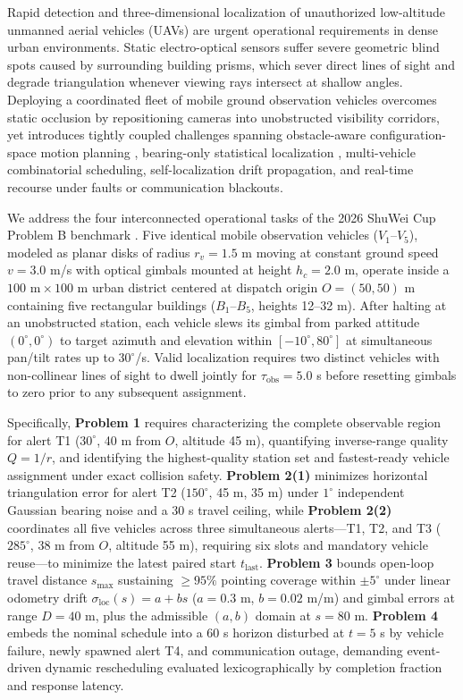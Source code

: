 Rapid detection and three-dimensional localization of unauthorized low-altitude unmanned aerial vehicles (UAVs) are urgent operational requirements in dense urban environments. Static electro-optical sensors suffer severe geometric blind spots caused by surrounding building prisms, which sever direct lines of sight and degrade triangulation whenever viewing rays intersect at shallow angles. Deploying a coordinated fleet of mobile ground observation vehicles overcomes static occlusion by repositioning cameras into unobstructed visibility corridors, yet introduces tightly coupled challenges spanning obstacle-aware configuration-space motion planning \cite{lozano1983}, bearing-only statistical localization \cite{bishop2010}, multi-vehicle combinatorial scheduling, self-localization drift propagation, and real-time recourse under faults or communication blackouts.

We address the four interconnected operational tasks of the 2026 ShuWei Cup Problem B benchmark \cite{problem}. Five identical mobile observation vehicles ($V_1$--$V_5$), modeled as planar disks of radius $r_v=1.5$ m moving at constant ground speed $v=3.0$ m/s with optical gimbals mounted at height $h_c=2.0$ m, operate inside a $100\text{ m}\times 100\text{ m}$ urban district centered at dispatch origin $O=(50,50)$ m containing five rectangular buildings ($B_1$--$B_5$, heights 12--32 m). After halting at an unobstructed station, each vehicle slews its gimbal from parked attitude $(0^\circ,0^\circ)$ to target azimuth and elevation within $[-10^\circ,80^\circ]$ at simultaneous pan/tilt rates up to $30^\circ$/s. Valid localization requires two distinct vehicles with non-collinear lines of sight to dwell jointly for $\tau_{\mathrm{obs}}=5.0$ s before resetting gimbals to zero prior to any subsequent assignment.

Specifically, \textbf{Problem 1} requires characterizing the complete observable region for alert T1 ($30^\circ$, 40 m from $O$, altitude 45 m), quantifying inverse-range quality $Q=1/r$, and identifying the highest-quality station set and fastest-ready vehicle assignment under exact collision safety. \textbf{Problem 2(1)} minimizes horizontal triangulation error for alert T2 ($150^\circ$, 45 m, 35 m) under $1^\circ$ independent Gaussian bearing noise and a 30 s travel ceiling, while \textbf{Problem 2(2)} coordinates all five vehicles across three simultaneous alerts—T1, T2, and T3 ($285^\circ$, 38 m from $O$, altitude 55 m), requiring six slots and mandatory vehicle reuse—to minimize the latest paired start $t_{\mathrm{last}}$. \textbf{Problem 3} bounds open-loop travel distance $s_{\max}$ sustaining $\ge 95\%$ pointing coverage within $\pm 5^\circ$ under linear odometry drift $\sigma_{\mathrm{loc}}(s)=a+bs$ ($a=0.3$ m, $b=0.02$ m/m) and gimbal errors at range $D=40$ m, plus the admissible $(a,b)$ domain at $s=80$ m. \textbf{Problem 4} embeds the nominal schedule into a 60 s horizon disturbed at $t=5$ s by vehicle failure, newly spawned alert T4, and communication outage, demanding event-driven dynamic rescheduling evaluated lexicographically by completion fraction and response latency.

